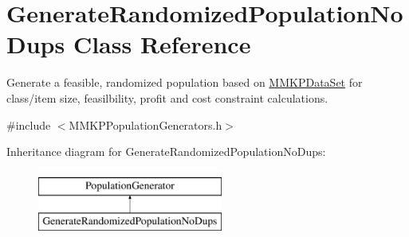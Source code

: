 \hypertarget{class_generate_randomized_population_no_dups}{\section{Generate\+Randomized\+Population\+No\+Dups Class Reference}
\label{class_generate_randomized_population_no_dups}
}


Generate a feasible, randomized population based on \hyperlink{class_m_m_k_p_data_set}{M\+M\+K\+P\+Data\+Set} for class/item size, feasilbility, profit and cost constraint calculations.  




{\ttfamily \#include $<$M\+M\+K\+P\+Population\+Generators.\+h$>$}

Inheritance diagram for Generate\+Randomized\+Population\+No\+Dups\+:\begin{figure}[H]
\begin{center}
\leavevmode
\includegraphics[height=2.000000cm]{class_generate_randomized_population_no_dups}
\end{center}
\end{figure}
